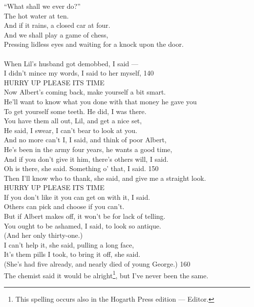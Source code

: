 \documentclass{article}
\begin{document}
``What shall we ever do?'' \\
\hspace*{2.5in} The hot water at ten. \\
And if it rains, a closed car at four. \\
And we shall play a game of chess, \\
Pressing lidless eyes and waiting for a knock upon the door. \\
 \\
When Lil's husband got demobbed, I said --- \\
I didn't mince my words, I said to her myself,                    \hfill 140 \\
HURRY UP PLEASE ITS TIME \\
Now Albert's coming back, make yourself a bit smart. \\
He'll want to know what you done with that money he gave you \\
To get yourself some teeth. He did, I was there. \\
You have them all out, Lil, and get a nice set, \\
He said, I swear, I can't bear to look at you. \\
And no more can't I, I said, and think of poor Albert, \\
He's been in the army four years, he wants a good time, \\
And if you don't give it him, there's others will, I said. \\
Oh is there, she said. Something o' that, I said.                 \hfill 150 \\
Then I'll know who to thank, she said, and give me a straight look. \\
HURRY UP PLEASE ITS TIME \\
If you don't like it you can get on with it, I said. \\
Others can pick and choose if you can't. \\
But if Albert makes off, it won't be for lack of telling. \\
You ought to be ashamed, I said, to look so antique. \\
(And her only thirty-one.) \\
I can't help it, she said, pulling a long face, \\
It's them pills I took, to bring it off, she said. \\
(She's had five already, and nearly died of young George.)        \hfill 160 \\
The chemist said it would be alright\footnote{This spelling occurs also in the Hogarth Press edition --- Editor.}, but I've never been the same. \\
\end{document}
